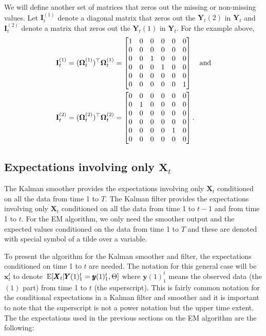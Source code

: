 \documentclass[]{article}
\def\OMG{\mbox{\boldmath $\Omega$}}
\def\IIm{\mbox{$\mathbf I$}}
\def\XX{\mbox{$\pmb{X}$}}	\def\xx{\mbox{$\pmb{x}$}}
\def\YY{\mbox{$\pmb{Y}$}}	\def\yy{\mbox{$\pmb{y}$}}
\def\E{\,\textup{\textrm{E}}}
\begin{document}
We will define another set of matrices that zeros out the missing or non-missing values. Let $\IIm_t^{(1)}$ denote a diagonal matrix that zeros out the $\YY_t(2)$ in $\YY_t$ and $\IIm_t^{(2)}$ denote a matrix that zeros out the $\YY_t(1)$ in $\YY_t$.  For the example above, 
\begin{equation}
\begin{split}
\IIm_t^{(1)} &= (\OMG_t^{(1)})^\top\OMG_t^{(1)} =
\begin{bmatrix}
1&0&0&0&0&0\\
0&0&0&0&0&0\\
0&0&1&0&0&0\\
0&0&0&1&0&0\\
0&0&0&0&0&0\\
0&0&0&0&0&1\\
\end{bmatrix}\quad\text{and}\\
\IIm_t^{(2)} &= (\OMG_t^{(2)})^\top\OMG_t^{(2)} =
\begin{bmatrix}
0&0&0&0&0&0\\
0&1&0&0&0&0\\
0&0&0&0&0&0\\
0&0&0&0&0&0\\
0&0&0&0&1&0\\
0&0&0&0&0&0\\
\end{bmatrix}.
\end{split}
\end{equation}

\subsection{Expectations involving only $\XX_t$}\label{sec:kalman.smoother}
The Kalman smoother provides the expectations involving only $\XX_t$ conditioned on all the data from time 1 to $T$. The Kalman filter provides the expectations involving only $\XX_t$ conditioned on all the data from time 1 to $t-1$ and from time 1 to $t$. For the EM algorithm, we only need the smoother output and the expected values conditioned on the data from time 1 to $T$ and these are denoted with special symbol of a tilde over a variable. 

To present the algorithm for the Kalman smoother and filter, the expectations conditioned on time 1 to $t$ are needed. The notation for this general case will be $\xx_t^t$ to denote $\E[\XX_t|\YY(1)_1^t=\yy(1)_1^t,\Theta]$ where $\yy(1)_1^t$ means the observed data (the $(1)$ part) from time 1 to $t$ (the superscript). This is fairly common notation for the conditional expectations in a Kalman filter and smoother and it is important to note that the superscript is not a power notation but the upper time extent. The the expectations used in the previous sections on the EM algorithm are the following:
 
\end{document}
